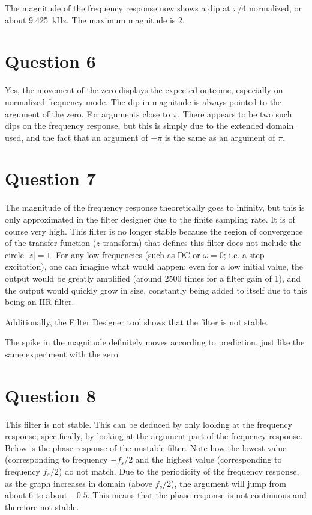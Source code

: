 \documentclass{article}
\begin{document}
The magnitude of the frequency response now shows a dip at
\(\pi/4\) normalized, or about \SI{9.425}{\kilo\hertz}. The
maximum magnitude is 2.

\section*{Question 6}
Yes, the movement of the zero displays the expected outcome,
especially on normalized frequency mode. The dip in magnitude is
always pointed to the argument of the zero. For arguments close
to \(\pi\), There appears to be two such dips on the frequency
response, but this is simply due to the extended domain used,
and the fact that an argument of \(-\pi\) is the same as
an argument of \(\pi\).

\section*{Question 7}
The magnitude of the frequency response theoretically goes to
infinity, but this is only approximated in the filter designer
due to the finite sampling rate. It is of course very high.
This filter is no longer stable because the region of convergence
of the transfer function (\(z\)-transform) that defines this
filter does not include the circle \(|z| = 1\).
For any low frequencies (such as DC or \(\omega = 0\); i.e. a
step excitation), one can
imagine what would happen: even for a low initial value, the
output would be greatly amplified (around 2500 times for a
filter gain of 1), and the output would quickly grow in size,
constantly being added to itself due to this being an IIR filter.

Additionally,
the Filter Designer tool shows that the filter is not stable.

The spike in the magnitude definitely moves according to prediction,
just like the same experiment with the zero.

\section*{Question 8}
This filter is not stable. This can be deduced by only looking
at the frequency response; specifically, by looking at the
argument part of the frequency response. Below is the phase
response of the unstable filter. Note how the lowest value
(corresponding to frequency \(-f_s/2\) and the highest value
(corresponding to frequency \(f_s/2\)) do not match.
Due to the periodicity of the frequency response, as the graph
increases in domain (above \(f_s/2\)), the argument will
jump from about 6 to about \(-0.5\).
This means that the phase response is not continuous and
therefore not stable.
\end{document}
